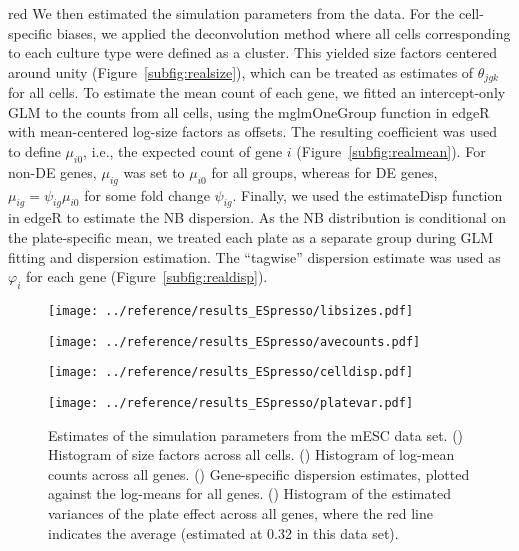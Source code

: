 \documentclass{article}
\begin{document}
\begin{color}{red}
We then estimated the simulation parameters from the data.
For the cell-specific biases, we applied the deconvolution method \citep{lun2016pooling} where all cells corresponding to each culture type were defined as a cluster.
This yielded size factors centered around unity (Figure~\ref{subfig:realsize}), which can be treated as estimates of $\theta_{jgk}$ for all cells.
To estimate the mean count of each gene, we fitted an intercept-only GLM to the counts from all cells, using the mglmOneGroup function in edgeR with mean-centered log-size factors as offsets.
The resulting coefficient was used to define $\mu_{i0}$, i.e., the expected count of gene $i$ (Figure~\ref{subfig:realmean}).
For non-DE genes, $\mu_{ig}$ was set to $\mu_{i0}$ for all groups, whereas for DE genes, $\mu_{ig} = \psi_{ig}\mu_{i0}$ for some fold change $\psi_{ig}$.
Finally, we used the estimateDisp function in edgeR to estimate the NB dispersion.
As the NB distribution is conditional on the plate-specific mean, we treated each plate as a separate group during GLM fitting and dispersion estimation.
The ``tagwise'' dispersion estimate was used as $\varphi_i$ for each gene (Figure~\ref{subfig:realdisp}).

\begin{figure}[p]
    \begin{minipage}{0.49\textwidth}
        \texttt{[image: ../reference/results\_ESpresso/libsizes.pdf]}
        \subcaption[]{}
        \label{subfig:realsize}
    \end{minipage}
    \begin{minipage}{0.49\textwidth}
        \texttt{[image: ../reference/results\_ESpresso/avecounts.pdf]}
        \subcaption[]{}
        \label{subfig:realmean}
    \end{minipage}
    \begin{minipage}{0.49\textwidth}
        \texttt{[image: ../reference/results\_ESpresso/celldisp.pdf]}
        \subcaption[]{}
        \label{subfig:realdisp}
    \end{minipage}
    \begin{minipage}{0.49\textwidth}
        \texttt{[image: ../reference/results\_ESpresso/platevar.pdf]}
        \subcaption[]{}
        \label{subfig:realplate}
    \end{minipage}
    \caption{Estimates of the simulation parameters from the mESC data set.
        () Histogram of size factors across all cells.
        () Histogram of log-mean counts across all genes.
        () Gene-specific dispersion estimates, plotted against the log-means for all genes.
        () Histogram of the estimated variances of the plate effect across all genes, where the red line indicates the average (estimated at 0.32 in this data set).
    }
\end{figure}


\end{color}
\end{document}
